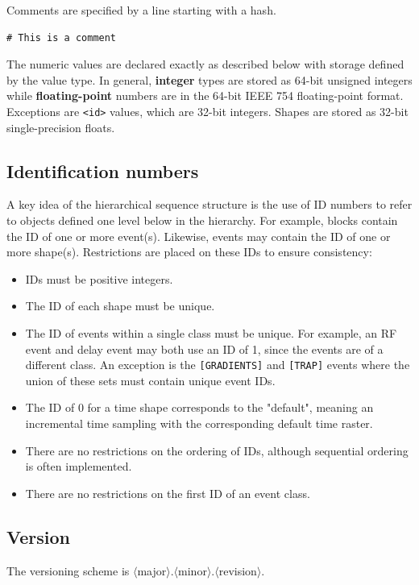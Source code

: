 \documentclass{article}
\begin{document}
Comments are specified by a line starting with a hash.
\begin{lstlisting}
# This is a comment
\end{lstlisting}

The numeric values are declared exactly as described below with storage defined by the value type. In general, \textbf{integer} types are stored as 64-bit unsigned integers while \textbf{floating-point} numbers are in the 64-bit IEEE 754 floating-point format. Exceptions are \verb.<id>. values, which are 32-bit integers. Shapes are stored as 32-bit single-precision floats.

\subsection{Identification numbers}
A key idea of the hierarchical sequence structure is the use of ID numbers to refer to objects defined one level below in the hierarchy. For example, blocks contain the ID of one or more event(s). Likewise, events may contain the ID of one or more shape(s). Restrictions are placed on these IDs to ensure consistency:
\begin{itemize}
\item IDs must be positive integers.
\item The ID of each shape must be unique.
\item The ID of events within a single class must be unique. For example, an RF event and delay event may both use an ID of 1, since the events are of a different class. An exception is the \verb.[GRADIENTS]. and \verb.[TRAP]. events where the union of these sets must contain unique event IDs.
\item The ID of 0 for a time shape corresponds to the "default", meaning an incremental time sampling with the corresponding default time raster.
\item There are no restrictions on the ordering of IDs, although sequential ordering is often implemented.
\item There are no restrictions on the first ID of an event class.
\end{itemize}

\subsection{Version}

The versioning scheme is $\langle$major$\rangle$.$\langle$minor$\rangle$.$\langle$revision$\rangle$.
\end{document}
